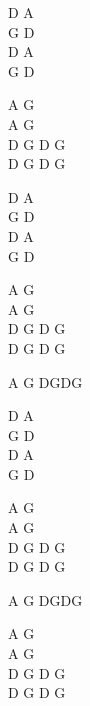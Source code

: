 \begin{chord}
    D A\\
    G D\\
    D A \\
    G D 

    A G\\
    A G \\
    D G D G \\
    D G D G 

    D A\\
    G D\\
    D A \\
    G D 

    A G\\
    A G \\
    D G D G \\
    D G D G 

    A G DGDG

    D A\\
    G D\\
    D A \\
    G D 

    A G\\
    A G \\
    D G D G \\
    D G D G 

    A G DGDG

    A G\\
    A G \\
    D G D G \\
    D G D G 
\end{chord}